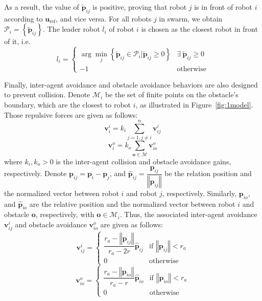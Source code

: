 As a result, the value of $\tilde{\mathbf{p}}_{ij}$ is positive, proving that robot $j$ is in front of robot $i$ according to $\mathbf{u}_\text{ref}$, and vice versa. For all robots $j$ in swarm, we obtain $\mathcal{P}_i=\left\{\tilde{\mathbf{p}}_{ij}\right\}$. The leader robot ${l_i}$ of robot $i$ is chosen as the closest robot in front of it, i.e.
\begin{equation}
     l_i=\begin{cases}
    \arg\min_{j}\left\{\tilde{\mathbf{p}}_{ij}\in\mathcal{P}_i\vert\tilde{\mathbf{p}}_{ij}\geq0\right\} & \exists~\tilde{\mathbf{p}}_{ij}\geq0\\ 
    -1 & \text{otherwise}
     \end{cases}
    \label{eqn:1li}
\end{equation}

Finally, inter-agent avoidance and obstacle avoidance behaviors are also designed to prevent collision. Denote $\mathcal{M}_i$ be the set of finite points on the obstacle's boundary, which are the closest to robot $i$, as illustrated in Figure~\ref{fig:1model}. Those repulsive forces are given as follows:
\begin{equation}
    \mathbf{v}_i^i=k_{i}\sum_{j=1,j\neq i}^n{\mathbf{v}_{ij}^i}
\end{equation}
\begin{equation}
    \mathbf{v}_i^o=k_o\sum_{\mathbf{o}\in\mathcal{M}}\mathbf{v}_{io}^o
\end{equation}
where $k_i,k_o>0$ is the inter-agent collision and obstacle avoidance gains, respectively. Denote $\mathbf{p}_{ij}=\mathbf{p}_i-\mathbf{p}_j$, and $\hat{\mathbf{p}}_{ij}=\dfrac{\mathbf{p}_{ij}}{\left\Vert \mathbf{p}_{ij}\right\Vert}$ be the relation position and the normalized vector between robot $i$ and robot $j$, respectively. Similarly, $\mathbf{p}_{io}$, and $\hat{\mathbf{p}}_{io}$ are the relative position and the normalized vector between robot $i$ and obstacle $\mathbf{o}$, respectively, with $\mathbf{o}\in\mathcal{M}_i$. Thus, the associated inter-agent avoidance $\mathbf{v}_{ij}^i$ and obstacle avoidance $\mathbf{v}_{io}^o$ are given as follows:
\begin{equation}
    \mathbf{v}_{ij}^{i}=\begin{cases}
    \dfrac{r_a-\left\Vert \mathbf{p}_{ij}\right\Vert}{r_a -2r}\hat{\mathbf{p}}_{ij} & \text{if }\left\Vert \mathbf{p}_{ij}\right\Vert<r_{a} \\
    0 & \text{otherwise}
    \end{cases}
    \label{eqn:1ui}
\end{equation}
\begin{equation}
    \mathbf{v}_{io}^{o}=\begin{cases}
    \dfrac{r_a-\left\Vert \mathbf{p}_{io}\right\Vert}{r_a -r}\hat{\mathbf{p}}_{io} & \text{if }\left\Vert \mathbf{p}_{io}\right\Vert<r_{a} \\
    0 & \text{otherwise}
    \end{cases}
    \label{eqn:1uo}
\end{equation}

